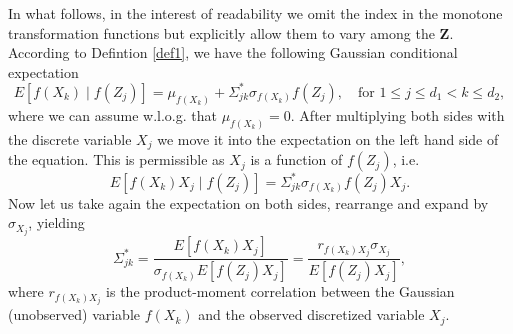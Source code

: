 In what follows, in the interest of readability we omit the index in the monotone transformation functions but explicitly allow them to vary among the $\boldsymbol{Z}$. According to Defintion \ref{def1}, we have the following Gaussian conditional expectation  
\begin{equation}
    E[f(X_k) \mid f(Z_j)] = \mu_{f(X_k)} + \Sigma_{jk}^*\sigma_{f(X_k)} f(Z_j), \quad \text{for } 1 \leq j \leq d_1 < k \leq d_2,
\end{equation}
where we can assume w.l.o.g. that $\mu_{f(X_k)} = 0$. After multiplying both sides with the discrete variable $X_j$ we move it into the expectation on the left hand side of the equation. This is permissible as $X_j$ is a function of $f(Z_j)$, i.e.
\begin{equation*}
    E[f(X_k)X_j \mid f(Z_j)] = \Sigma_{jk}^*\sigma_{f(X_k)} f(Z_j)X_j.
\end{equation*}
Now let us take again the expectation on both sides, rearrange and expand by $\sigma_{X_j}$, yielding
\begin{equation}\label{population_polyserial_nonpara}
        \Sigma_{jk}^* = \frac{E[f(X_k)X_j]}{\sigma_{f(X_k)} E[f(Z_j)X_j]} = \frac{r_{f(X_k)X_j}\sigma_{X_j}}{E[f(Z_j)X_j]},
\end{equation}
where $r_{f(X_k)X_j}$ is the product-moment correlation between the Gaussian (unobserved) variable $f(X_k)$ and the observed discretized variable $X_j$. 

